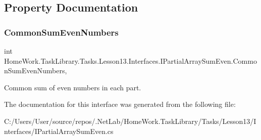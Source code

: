 \subsection{Property Documentation}
\mbox{\label{interface_home_work_1_1_task_library_1_1_tasks_1_1_lesson13_1_1_interfaces_1_1_i_partial_array_sum_even_adb731dd776707d69635ad2e37932f1ea}} 
\subsubsection{\texorpdfstring{CommonSumEvenNumbers}{CommonSumEvenNumbers}}
{\footnotesize\ttfamily int Home\+Work.\+Task\+Library.\+Tasks.\+Lesson13.\+Interfaces.\+I\+Partial\+Array\+Sum\+Even.\+Common\+Sum\+Even\+Numbers\hspace{0.3cm}{\ttfamily [get]}, {\ttfamily [set]}}



Common sum of even numbers in each part. 



The documentation for this interface was generated from the following file\+:\begin{DoxyCompactItemize}
\item 
C\+:/\+Users/\+User/source/repos/.\+Net\+Lab/\+Home\+Work.\+Task\+Library/\+Tasks/\+Lesson13/\+Interfaces/I\+Partial\+Array\+Sum\+Even.\+cs\end{DoxyCompactItemize}

